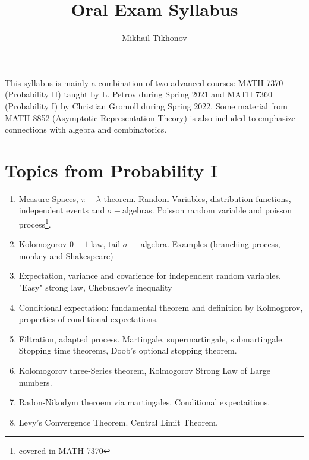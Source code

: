 \documentclass{article}
\title{Oral Exam Syllabus}
\author{Mikhail Tikhonov}
\date{}
\begin{document}
\maketitle

This syllabus is mainly a combination of two advanced courses: MATH 7370 (Probability II) taught by L. Petrov during Spring 2021 and MATH 7360 (Probability I) by Christian Gromoll during Spring 2022. Some material from MATH 8852 (Asymptotic Representation Theory) is also included to emphasize connections with algebra and combinatorics.

\section*{Topics from Probability I}

\begin{enumerate}
    \item Measure Spaces, $\pi - \lambda$ theorem. Random Variables, distribution functions, independent events and $\sigma-$algebras. Poisson random variable and poisson process\footnote{covered in MATH 7370}.
    \item Kolomogorov $0-1$ law, tail $\sigma-$ algebra. Examples (branching process, monkey and Shakespeare)
    \item Expectation, variance and covarience for independent random variables. "Easy" strong law, Chebushev's inequality
    \item Conditional expectation: fundamental theorem and definition by Kolmogorov, properties of conditional expectations. 
    \item Filtration, adapted process. Martingale, supermartingale, submartingale. Stopping time theorems, Doob's optional stopping theorem.
    \item Kolomogorov three-Series theorem, Kolmogorov Strong Law of Large numbers. 
    \item Radon-Nikodym theroem via martingales. Conditional expectaitions.
    \item Levy's Convergence Theorem. Central Limit Theorem. 
\end{enumerate}
\end{document}
